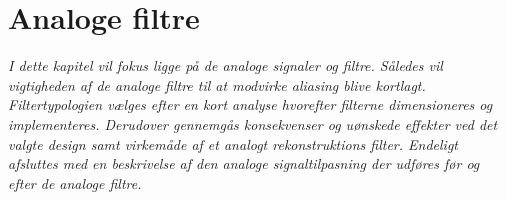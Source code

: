 \chapter{Analoge filtre}\label{kap:filtre}
\vspace*{0.5 cm}
\emph{I dette kapitel vil fokus ligge på de analoge signaler og filtre. Således vil vigtigheden af de analoge filtre til at modvirke aliasing blive kortlagt. Filtertypologien vælges efter en kort analyse hvorefter filterne dimensioneres og implementeres. Derudover gennemgås konsekvenser og uønskede effekter ved det valgte design samt virkemåde af et analogt rekonstruktions filter. Endeligt afsluttes med en beskrivelse af den analoge signaltilpasning der udføres før og efter de analoge filtre.}
